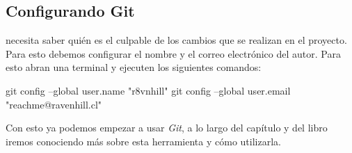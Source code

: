 \subsection{Configurando Git}
   necesita saber quién es el culpable de los cambios que se realizan en el proyecto.
  Para esto debemos configurar el nombre y el correo electrónico del autor.
  Para esto abran una terminal y ejecuten los siguientes comandos:

  \begin{bash}
    git config --global user.name "r8vnhill"
    git config --global user.email "reachme@ravenhill.cl"
  \end{bash}

  Con esto ya podemos empezar a usar \textit{Git}, a lo largo del capítulo y del libro iremos 
  conociendo más sobre esta herramienta y cómo utilizarla.
  